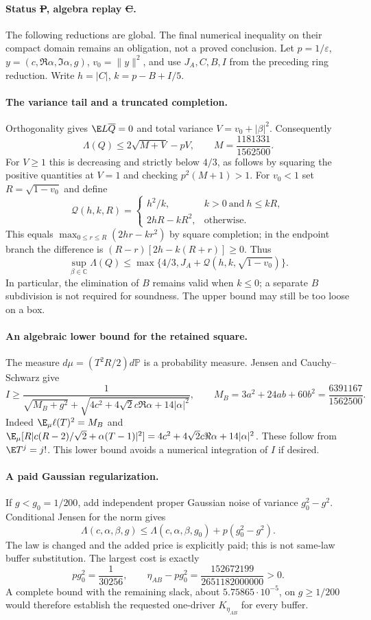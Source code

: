 \paragraph{Status \st{P}, algebra replay \st{C}.}
The following reductions are global. The final numerical inequality on their compact domain remains an obligation, not a proved conclusion.
Let $p=1/\varepsilon$, $y=(c,\Re\alpha,\Im\alpha,g)$, $v_0=\|y\|^2$, and use $J_A,C,B,I$ from the preceding ring reduction. Write $h=|C|$, $k=p-B+I/5$.

\paragraph{The variance tail and a truncated completion.}
Orthogonality gives $\E L\overline Q=0$ and total variance $V=v_0+|\beta|^2$. Consequently
\[
 \Lambda(Q)\le2\sqrt{M+V}-pV,\qquad M=\frac{1181331}{1562500}.
\]
For $V\ge1$ this is decreasing and strictly below $4/3$, as follows by squaring the positive quantities at $V=1$ and checking $p^2(M+1)>1$.
For $v_0<1$ set $R=\sqrt{1-v_0}$ and define
\[
 \mathcal Q(h,k,R)=
 \begin{cases}h^2/k,&k>0\ \text{and}\ h\le kR,\\
 2hR-kR^2,&\text{otherwise}.
 \end{cases}
\]
This equals $\max_{0\le r\le R}(2hr-kr^2)$ by square completion; in the endpoint branch the difference is $(R-r)[2h-k(R+r)]\ge0$. Thus
\[
 \boxed{\sup_{\beta\in\mathbb C}\Lambda(Q)
 \le\max\{4/3,J_A+\mathcal Q(h,k,\sqrt{1-v_0})\}.}
\]
In particular, the elimination of $B$ remains valid when $k\le0$; a separate $B$ subdivision is not required for soundness. The upper bound may still be too loose on a box.

\paragraph{An algebraic lower bound for the retained square.}
The measure $d\mu=(T^2R/2)d\mathbb P$ is a probability measure. Jensen and Cauchy--Schwarz give
\[
 I\ge\frac1{\sqrt{M_B+g^2}+
  \sqrt{4c^2+4\sqrt2c\Re\alpha+14|\alpha|^2}},
 \qquad M_B=3a^2+24ab+60b^2=\frac{6391167}{1562500}.
\]
Indeed $\E_\mu\ell(T)^2=M_B$ and
$\E_\mu[R|c(R-2)/\sqrt2+\alpha(T-1)|^2]
=4c^2+4\sqrt2c\Re\alpha+14|\alpha|^2$. These follow from $\E T^j=j!$. This lower bound avoids a numerical integration of $I$ if desired.

\paragraph{A paid Gaussian regularization.}
If $g<g_0=1/200$, add independent proper Gaussian noise of variance $g_0^2-g^2$. Conditional Jensen for the norm gives
\[
 \Lambda(c,\alpha,\beta,g)
 \le\Lambda(c,\alpha,\beta,g_0)+p(g_0^2-g^2).
\]
The law is changed and the added price is explicitly paid; this is not same-law buffer substitution. The largest cost is exactly
\[
 pg_0^2=\frac1{30256},\qquad
 \eta_{AB}-pg_0^2=\frac{152672199}{2651182000000}>0.
\]
A complete bound with the remaining slack, about $5.75865\cdot10^{-5}$, on $g\ge1/200$ would therefore establish the requested one-driver $K_{\eta_{AB}}$ for every buffer.

